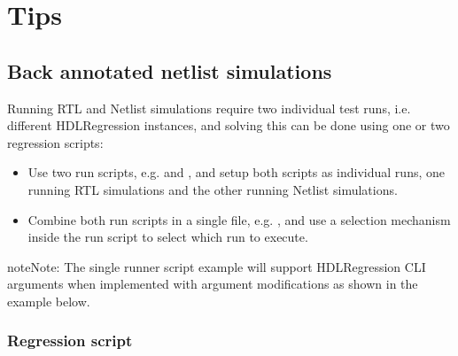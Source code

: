 \documentclass[letterpaper,10pt,english]{sphinxmanual}
\begin{document}
\chapter{Tips}
\label{\detokenize{tips:tips}}\label{\detokenize{tips::doc}}

\section{Back annotated netlist simulations}
\label{\detokenize{tips:back-annotated-netlist-simulations}}
\sphinxAtStartPar
Running RTL and Netlist simulations require two individual test runs, i.e. different HDLRegression instances, and solving
this can be done using one or two regression scripts:
\begin{itemize}
\item {} 
\sphinxAtStartPar
Use two run scripts, e.g.  and , and setup both scripts as individual runs,
one running RTL simulations and the other running Netlist simulations.

\item {} 
\sphinxAtStartPar
Combine both run scripts in a single file, e.g. , and use a selection mechanism inside the
run script to select which run to execute.

\end{itemize}

\begin{sphinxadmonition}{note}{Note:}
\sphinxAtStartPar
The single runner script example will support HDLRegression CLI arguments when implemented with
argument modifications as shown in the example below.
\end{sphinxadmonition}


\subsection{Regression script}
\label{\detokenize{tips:regression-script}}
\sphinxAtStartPar
{}

\begin{sphinxVerbatim}[commandchars=\\\{\}]
 

 
\end{sphinxVerbatim}
\end{document}
